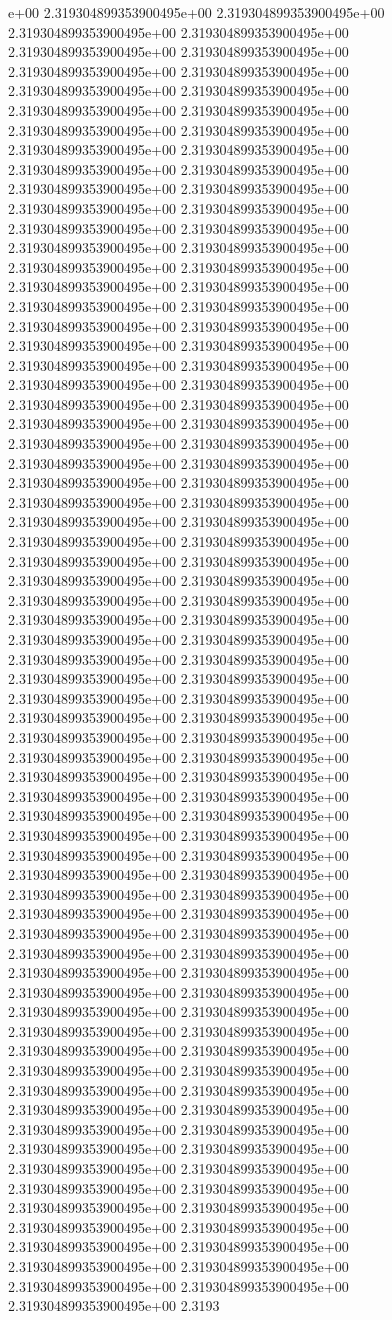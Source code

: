 e+00	2.319304899353900495e+00	2.319304899353900495e+00	2.319304899353900495e+00	2.319304899353900495e+00	2.319304899353900495e+00	2.319304899353900495e+00	2.319304899353900495e+00	2.319304899353900495e+00	2.319304899353900495e+00	2.319304899353900495e+00	2.319304899353900495e+00	2.319304899353900495e+00	2.319304899353900495e+00	2.319304899353900495e+00	2.319304899353900495e+00	2.319304899353900495e+00	2.319304899353900495e+00	2.319304899353900495e+00	2.319304899353900495e+00	2.319304899353900495e+00	2.319304899353900495e+00	2.319304899353900495e+00	2.319304899353900495e+00	2.319304899353900495e+00	2.319304899353900495e+00	2.319304899353900495e+00	2.319304899353900495e+00	2.319304899353900495e+00	2.319304899353900495e+00	2.319304899353900495e+00	2.319304899353900495e+00	2.319304899353900495e+00	2.319304899353900495e+00	2.319304899353900495e+00	2.319304899353900495e+00	2.319304899353900495e+00	2.319304899353900495e+00	2.319304899353900495e+00	2.319304899353900495e+00	2.319304899353900495e+00	2.319304899353900495e+00	2.319304899353900495e+00	2.319304899353900495e+00	2.319304899353900495e+00	2.319304899353900495e+00	2.319304899353900495e+00	2.319304899353900495e+00	2.319304899353900495e+00	2.319304899353900495e+00	2.319304899353900495e+00	2.319304899353900495e+00	2.319304899353900495e+00	2.319304899353900495e+00	2.319304899353900495e+00	2.319304899353900495e+00	2.319304899353900495e+00	2.319304899353900495e+00	2.319304899353900495e+00	2.319304899353900495e+00	2.319304899353900495e+00	2.319304899353900495e+00	2.319304899353900495e+00	2.319304899353900495e+00	2.319304899353900495e+00	2.319304899353900495e+00	2.319304899353900495e+00	2.319304899353900495e+00	2.319304899353900495e+00	2.319304899353900495e+00	2.319304899353900495e+00	2.319304899353900495e+00	2.319304899353900495e+00	2.319304899353900495e+00	2.319304899353900495e+00	2.319304899353900495e+00	2.319304899353900495e+00	2.319304899353900495e+00	2.319304899353900495e+00	2.319304899353900495e+00	2.319304899353900495e+00	2.319304899353900495e+00	2.319304899353900495e+00	2.319304899353900495e+00	2.319304899353900495e+00	2.319304899353900495e+00	2.319304899353900495e+00	2.319304899353900495e+00	2.319304899353900495e+00	2.319304899353900495e+00	2.319304899353900495e+00	2.319304899353900495e+00	2.319304899353900495e+00	2.319304899353900495e+00	2.319304899353900495e+00	2.319304899353900495e+00	2.319304899353900495e+00	2.319304899353900495e+00	2.319304899353900495e+00	2.319304899353900495e+00	2.319304899353900495e+00	2.319304899353900495e+00	2.319304899353900495e+00	2.319304899353900495e+00	2.319304899353900495e+00	2.319304899353900495e+00	2.319304899353900495e+00	2.319304899353900495e+00	2.319304899353900495e+00	2.319304899353900495e+00	2.319304899353900495e+00	2.319304899353900495e+00	2.319304899353900495e+00	2.319304899353900495e+00	2.319304899353900495e+00	2.319304899353900495e+00	2.319304899353900495e+00	2.319304899353900495e+00	2.319304899353900495e+00	2.319304899353900495e+00	2.319304899353900495e+00	2.319304899353900495e+00	2.319304899353900495e+00	2.319304899353900495e+00	2.319304899353900495e+00	2.319304899353900495e+00	2.319304899353900495e+00	2.319304899353900495e+00	2.319304899353900495e+00	2.319304899353900495e+00	2.319304899353900495e+00	2.319304899353900495e+00	2.319304899353900495e+00	2.319304899353900495e+00	2.3193